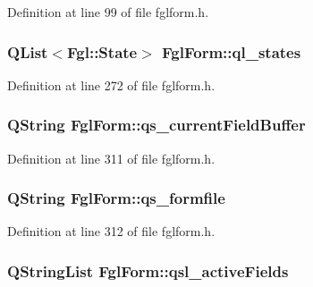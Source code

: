 Definition at line 99 of file fglform.h.

\hypertarget{classFglForm_a18774054d5c9773a7075b5933b0bbc9a}{
\subsubsection[{ql\_\-states}]{\setlength{\rightskip}{0pt plus 5cm}QList$<${\bf Fgl::State}$>$ {\bf FglForm::ql\_\-states}}}
\label{classFglForm_a18774054d5c9773a7075b5933b0bbc9a}


Definition at line 272 of file fglform.h.

\hypertarget{classFglForm_a04725912842355fc88fa7412e435f4a9}{
\subsubsection[{qs\_\-currentFieldBuffer}]{\setlength{\rightskip}{0pt plus 5cm}QString {\bf FglForm::qs\_\-currentFieldBuffer}}}
\label{classFglForm_a04725912842355fc88fa7412e435f4a9}


Definition at line 311 of file fglform.h.

\hypertarget{classFglForm_a1bca5dcb62f50a5939c295b7c0d662d2}{
\subsubsection[{qs\_\-formfile}]{\setlength{\rightskip}{0pt plus 5cm}QString {\bf FglForm::qs\_\-formfile}}}
\label{classFglForm_a1bca5dcb62f50a5939c295b7c0d662d2}


Definition at line 312 of file fglform.h.

\hypertarget{classFglForm_a127a846458930510880fd13eb07d4463}{
\subsubsection[{qsl\_\-activeFields}]{\setlength{\rightskip}{0pt plus 5cm}QStringList {\bf FglForm::qsl\_\-activeFields}}}
\label{classFglForm_a127a846458930510880fd13eb07d4463}



